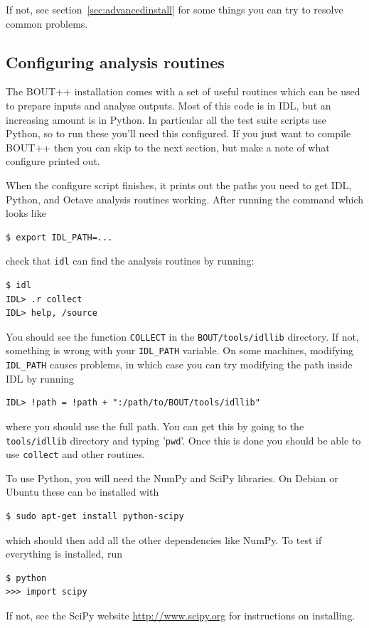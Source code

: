 \documentclass[12pt]{article}
\begin{document}
If not, see section~\ref{sec:advancedinstall} for some things you can
try to resolve common problems.

\subsection{Configuring analysis routines}
\label{sec:configanalysis}

The BOUT++ installation comes with a set of useful routines which can
be used to prepare inputs and analyse outputs. Most of this code
is in IDL, but an increasing amount is in Python. In particular all the
test suite scripts use Python, so to run these you'll need this configured.
If you just want to compile BOUT++ then you can skip to the next section, but make a note of what configure printed out.

When the configure script finishes, it prints out the paths you need
to get IDL, Python, and Octave analysis routines working. After running
the  command which looks like
\begin{verbatim}
$ export IDL_PATH=...
\end{verbatim}
check that \texttt{idl} can find the analysis routines by running:
\begin{verbatim}
$ idl
IDL> .r collect
IDL> help, /source
\end{verbatim}
You should see the function \texttt{COLLECT} in the \texttt{BOUT/tools/idllib} directory. If not, something is wrong with your \texttt{IDL\_PATH} variable. On some machines, modifying \texttt{IDL\_PATH} causes problems, in which case you can try modifying the path inside IDL by running
\begin{verbatim}
IDL> !path = !path + ":/path/to/BOUT/tools/idllib"
\end{verbatim}
where you should use the full path. You can get this by going to the \texttt{tools/idllib} directory and typing '\texttt{pwd}'. Once this is done you should be able to use \texttt{collect} and other routines.


To use Python, you will need the NumPy and SciPy libraries. On Debian or Ubuntu
these can be installed with
\begin{verbatim}
$ sudo apt-get install python-scipy
\end{verbatim}
which should then add all the other dependencies like NumPy. To test if everything is installed, run
\begin{verbatim}
$ python
>>> import scipy
\end{verbatim}
If not, see the SciPy website \url{http://www.scipy.org} for instructions
on installing.
\end{document}
